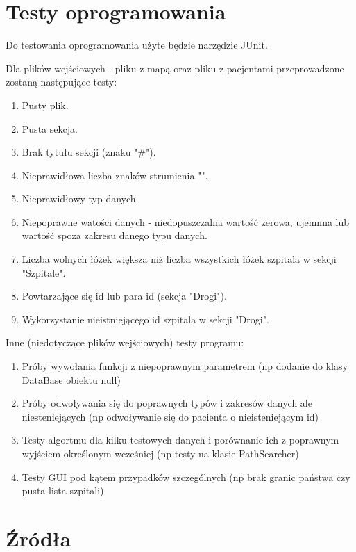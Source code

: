 \documentclass[10pt,a4paper]{article}
\begin{document}
\section{Testy oprogramowania}

Do testowania oprogramowania użyte będzie narzędzie JUnit.

Dla plików wejściowych - pliku z mapą oraz pliku z pacjentami przeprowadzone zostaną następujące testy:
 
\begin{enumerate}
    \item Pusty plik.
    \item Pusta sekcja.
    \item Brak tytułu sekcji (znaku "\#").
    \item Nieprawidłowa liczba znaków strumienia "\textbar".
    \item Nieprawidłowy typ danych.
    \item Niepoprawne watości danych - niedopuszczalna wartość zerowa, ujemnna lub wartość spoza zakresu danego typu danych.
    \item Liczba wolnych łóżek większa niż liczba wszystkich łóżek szpitala w sekcji "Szpitale".
    \item Powtarzające się id lub para id (sekcja "Drogi").
    \item Wykorzystanie nieistniejącego id szpitala w sekcji "Drogi".
\end{enumerate}
\newpage
Inne (niedotyczące plików wejściowych) testy programu:
\begin{enumerate}
    \item Próby wywołania funkcji z niepoprawnym parametrem (np dodanie do klasy DataBase obiektu null)
    \item Próby odwoływania się do poprawnych typów i zakresów danych ale niesteniejących (np odwoływanie się do pacienta o nieisteniejącym id)
    \item Testy algortmu dla kilku testowych danych i porównanie ich z poprawnym wyjściem określonym wcześniej (np testy na klasie PathSearcher)
    \item Testy GUI pod kątem przypadków szczególnych (np brak granic państwa czy pusta lista szpitali)
\end{enumerate}


\section{Źródła}
\end{document}
